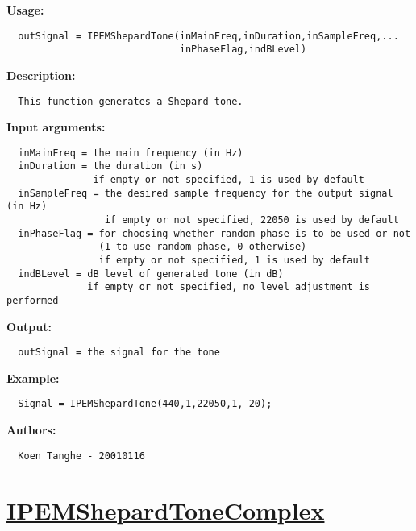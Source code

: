 \textbf{Usage:}
\begin{verbatim}  outSignal = IPEMShepardTone(inMainFreq,inDuration,inSampleFreq,...
                              inPhaseFlag,indBLevel)

\end{verbatim}
\textbf{Description:}
\begin{verbatim}  This function generates a Shepard tone.

\end{verbatim}
\textbf{Input arguments:}
\begin{verbatim}  inMainFreq = the main frequency (in Hz)
  inDuration = the duration (in s)
               if empty or not specified, 1 is used by default
  inSampleFreq = the desired sample frequency for the output signal (in Hz)
                 if empty or not specified, 22050 is used by default
  inPhaseFlag = for choosing whether random phase is to be used or not
                (1 to use random phase, 0 otherwise)
                if empty or not specified, 1 is used by default
  indBLevel = dB level of generated tone (in dB)
              if empty or not specified, no level adjustment is performed

\end{verbatim}
\textbf{Output:}
\begin{verbatim}  outSignal = the signal for the tone

\end{verbatim}
\textbf{Example:}
\begin{verbatim}  Signal = IPEMShepardTone(440,1,22050,1,-20);

\end{verbatim}
\textbf{Authors:}
\begin{verbatim}  Koen Tanghe - 20010116
\end{verbatim}


\newpage
\section*{\hyperlink{Concepts:IPEMShepardToneComplex}{IPEMShepardToneComplex}}
\hypertarget{FuncRef:IPEMShepardToneComplex}{}

